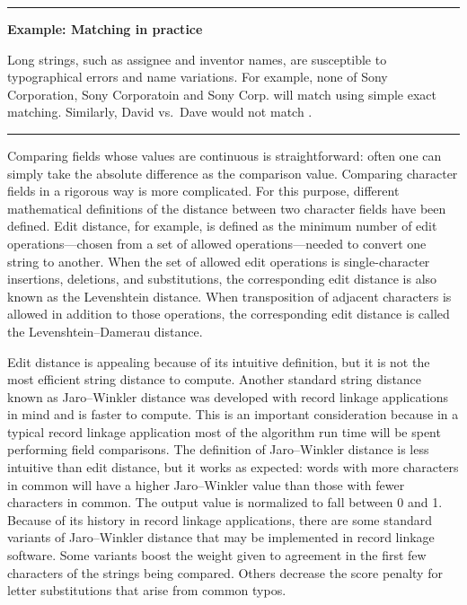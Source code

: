\documentclass[]{krantz}
\begin{document}
\begin{center}\rule{0.5\linewidth}{\linethickness}\end{center}

\textbf{Example: Matching in practice}

Long strings, such as assignee and inventor names, are susceptible to
typographical errors and name variations. For example, none of Sony
Corporation, Sony Corporatoin and Sony Corp. will match using simple
exact matching. Similarly, David vs.~Dave would not match
\citep{ventura2015seeing}.

\begin{center}\rule{0.5\linewidth}{\linethickness}\end{center}

Comparing fields whose values are continuous is straightforward: often
one can simply take the absolute difference as the comparison value.
Comparing character fields in a rigorous way is more complicated. For
this purpose, different mathematical definitions of the distance between
two character fields have been defined. Edit distance, for example, is
defined as the minimum number of edit operations---chosen from a set of
allowed operations---needed to convert one string to another. When the
set of allowed edit operations is single-character insertions,
deletions, and substitutions, the corresponding edit distance is also
known as the Levenshtein distance. When transposition of adjacent
characters is allowed in addition to those operations, the corresponding
edit distance is called the Levenshtein--Damerau distance.

Edit distance is appealing because of its intuitive definition, but it
is not the most efficient string distance to compute. Another standard
string distance known as Jaro--Winkler distance was developed with
record linkage applications in mind and is faster to compute. This is an
important consideration because in a typical record linkage application
most of the algorithm run time will be spent performing field
comparisons. The definition of Jaro--Winkler distance is less intuitive
than edit distance, but it works as expected: words with more characters
in common will have a higher Jaro--Winkler value than those with fewer
characters in common. The output value is normalized to fall between 0
and 1. Because of its history in record linkage applications, there are
some standard variants of Jaro--Winkler distance that may be implemented
in record linkage software. Some variants boost the weight given to
agreement in the first few characters of the strings being compared.
Others decrease the score penalty for letter substitutions that arise
from common typos.
\end{document}
